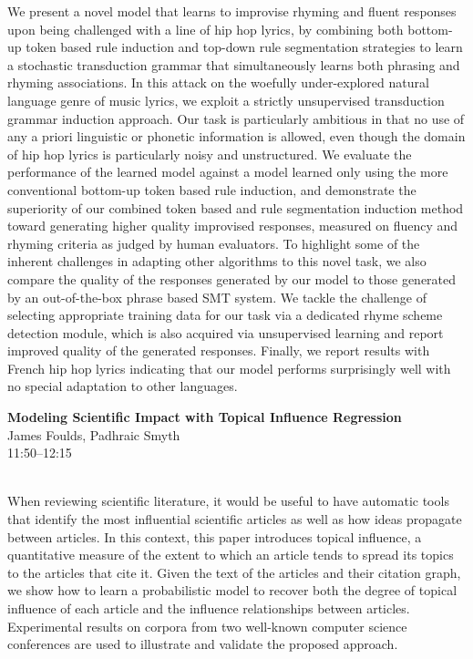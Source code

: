 \documentclass[twoside,makeidx]{book}
\begin{document}
{\small We present a novel model that learns to improvise rhyming and fluent responses upon being challenged with a line of hip hop lyrics, by combining both bottom-up token based rule induction and top-down rule segmentation strategies to learn a stochastic transduction grammar that simultaneously learns both phrasing and rhyming associations. In this attack on the woefully under-explored natural language genre of music lyrics, we exploit a strictly unsupervised transduction grammar induction approach. Our task is particularly ambitious in that no use of any a priori linguistic or phonetic information is allowed, even though the domain of hip hop lyrics is particularly noisy and unstructured. We evaluate the performance of the learned model against a model learned only using the more conventional bottom-up token based rule induction, and demonstrate the superiority of our combined token based and rule segmentation induction method toward generating higher quality improvised responses, measured on fluency and rhyming criteria as judged by human evaluators. To highlight some of the inherent challenges in adapting other algorithms to this novel task, we also compare the quality of the responses generated by our model to those generated by an out-of-the-box phrase based SMT system. We tackle the challenge of selecting appropriate training data for our task via a dedicated rhyme scheme detection module, which is also acquired via unsupervised learning and report improved quality of the generated responses. Finally, we report results with French hip hop lyrics indicating that our model performs surprisingly well with no special adaptation to other languages.}
\par\vspace{2em}\noindent%
\begin{minipage}{\linewidth}%
\begin{center}
\textbf{\normalsize Modeling Scientific Impact with Topical Influence Regression}\\
\normalsize  James Foulds,  Padhraic Smyth\\
{\small 11:50--12:15}\\
\end{center}
\end{minipage}\\[0.5em]
\nopagebreak%
\noindent%
{\small When reviewing scientific literature, it would be useful to have automatic tools that identify the most influential scientific articles as well as how ideas propagate between articles.  In this context, this paper introduces topical influence, a quantitative measure of the extent to which an article tends to spread its topics to the articles that cite it.  Given the text of the articles and their citation graph, we show how to learn a probabilistic model to recover both the degree of topical influence of each article and the influence relationships between articles.  Experimental results on corpora from two well-known computer science conferences are used to illustrate and validate the proposed approach.}
\end{document}
